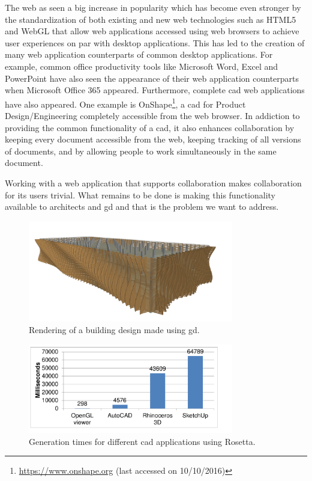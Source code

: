 The web as seen a big increase in popularity which has become even stronger by the standardization of both existing and new web technologies such as HTML5\cite{hickson2011html5} and WebGL\cite{marrin2011webgl} that allow web applications accessed using web browsers to achieve user experiences on par with desktop applications.
This has led to the creation of many web application counterparts of common desktop applications.
For example, common office productivity tools like Microsoft Word, Excel and PowerPoint have also seen the appearance of their web application counterparts when Microsoft Office 365 appeared.
Furthermore, complete \gls{cad} web applications have also appeared.
One example is OnShape\footnote{\url{https://www.onshape.org} (last accessed on 10/10/2016)}, a \gls{cad} for Product Design/Engineering completely accessible from the web browser.
In addiction to providing the common functionality of a \gls{cad}, it also enhances collaboration by keeping every document accessible from the web, keeping tracking of all versions of documents, and by allowing people to work simultaneously in the same document.

Working with a web application that supports collaboration makes collaboration for its users trivial.
What remains to be done is making this functionality available to architects and \gls{gd} and that is the problem we want to address.

\begin{figure}
	\centering
	\includegraphics[width=0.8\textwidth]{images/carmo_render}
	\caption{Rendering of a building design made using \gls{gd}.}
	\label{fig:carmo:render}
\end{figure}

\begin{figure}
	\centering
	\includegraphics[width=0.8\textwidth]{images/carmo_rosetta_times}
	\caption{Generation times for different \gls{cad} applications using Rosetta.}
	\label{fig:carmo:times}
\end{figure}


